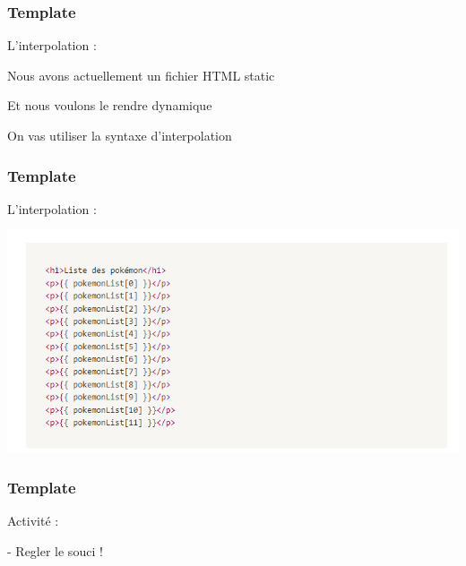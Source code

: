 \documentclass[10pt]{beamer}
\begin{document}
	\begin{frame}
		\frametitle{Template}

		L'interpolation : \newline \newline

		Nous avons actuellement un fichier HTML \alert{static} \newline \newline

		Et nous voulons le rendre \alert{dynamique} \newline \newline

		On vas utiliser la syntaxe d’interpolation


	\end{frame}

	\begin{frame}
		\frametitle{Template}

		L'interpolation : \newline


		\centering
		\includegraphics[width=14cm]{assets/inter} \newline


	\end{frame}

	\begin{frame}
		\frametitle{Template}

		Activité : \newline \newline

		- Regler le souci !

	\end{frame}
\end{document}
